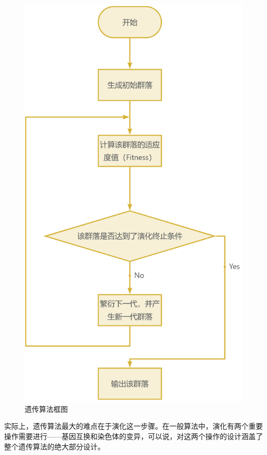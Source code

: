 \begin{figure}[h]
    \centering
    \includegraphics[scale=0.15]{res/GeneticAlgorithmDiagram.png}
    \caption{遗传算法框图}
    \label{GeneticAlgorithmDiagram}
\end{figure}

实际上，遗传算法最大的难点在于演化这一步骤。在一般算法中，演化有两个重要操作需要进行——基因互换和染色体的变异，可以说，对这两个操作的设计涵盖了整个遗传算法的绝大部分设计。


